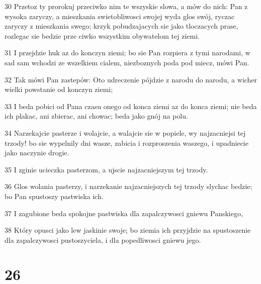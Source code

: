 \par 30 Przetoz ty prorokuj przeciwko nim te wszyskie slowa, a mów do nich: Pan z wysoka zaryczy, a mieszkania swietobliwosci swojej wyda glos swój, ryczac zaryczy z mieszkania swego; krzyk pobudzajacych sie jako tloczacych prase, rozlegac sie bedzie prze ciwko wszystkim obywatelom tej ziemi.
\par 31 I przejdzie huk az do konczyn ziemi; bo sie Pan rozpiera z tymi narodami, w sad sam wchodzi ze wszelkiem cialem, niezboznych poda pod miecz, mówi Pan.
\par 32 Tak mówi Pan zastepów: Oto udreczenie pójdzie z narodu do narodu, a wicher wielki powstanie od konczyn ziemi;
\par 33 I beda pobici od Pana czasu onego od konca ziemi az do konca ziemi; nie beda ich plakac, ani zbierac, ani chowac; beda jako gnój na polu.
\par 34 Narzekajcie pasterze i wolajcie, a walajcie sie w popiele, wy najzacniejsi tej trzody! bo sie wypelnily dni wasze, zabicia i rozproszenia waszego, i upadniecie jako naczynie drogie.
\par 35 I zginie ucieczka pasterzom, a ujscie najzacniejszym tej trzody.
\par 36 Glos wolania pasterzy, i narzekanie najzacniejszych tej trzody slychac bedzie; bo Pan spustoszy pastwiska ich.
\par 37 I zagubione beda spokojne pastwiska dla zapalczywosci gniewu Panskiego,
\par 38 Który opusci jako lew jaskinie swoje; bo ziemia ich przyjdzie na spustoszenie dla zapalczywosci pustoszyciela, i dla popedliwosci gniewu jego.

\chapter{26}

